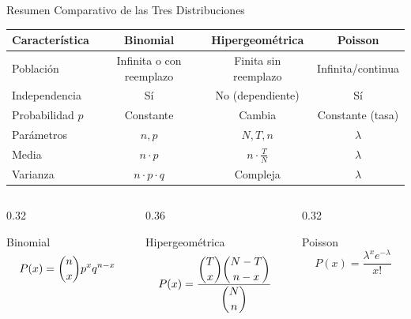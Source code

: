 \documentclass[10pt]{beamer}
\begin{document}
\begin{frame}{Resumen Comparativo de las Tres Distribuciones}
\begin{table}
\centering
\small
\begin{tabular}{@{}lccc@{}}
\toprule
\textbf{Característica} & \textbf{Binomial} & \textbf{Hipergeométrica} & \textbf{Poisson} \\
\midrule
Población & Infinita o con reemplazo & Finita sin reemplazo & Infinita/continua \\
Independencia & Sí & No (dependiente) & Sí \\
Probabilidad $p$ & Constante & Cambia & Constante (tasa) \\
Parámetros & $n, p$ & $N, T, n$ & $\lambda$ \\
Media & $n \cdot p$ & $n \cdot \frac{T}{N}$ & $\lambda$ \\
Varianza & $n \cdot p \cdot q$ & Compleja & $\lambda$ \\
\bottomrule
\end{tabular}
\end{table}

\vspace{0.3cm}
\begin{columns}[T]
\begin{column}{0.32\textwidth}
\begin{block}{Binomial}
\[
P(x) = \dbinom{n}{x} p^{x} q^{n-x}
\]
\end{block}
\end{column}
\begin{column}{0.36\textwidth}
\begin{block}{Hipergeométrica}
\[
P(x) = \frac{\dbinom{T}{x}\dbinom{N-T}{n-x}}{\dbinom{N}{n}}
\]
\end{block}
\end{column}
\begin{column}{0.32\textwidth}
\begin{block}{Poisson}
\[
P(x) = \frac{\lambda^{x} e^{-\lambda}}{x!}
\]
\end{block}
\end{column}
\end{columns}
\end{frame}
\end{document}
